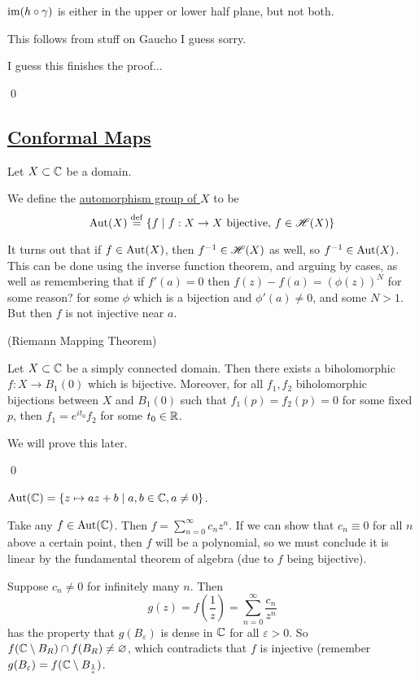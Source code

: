\documentclass[x11names,reqno,14pt]{extarticle}
\newcommand{\oo}{{\infty}}
\begin{document}
\claim

$\operatorname{\mathrm{im}}(h\circ\gamma)$ is either in the upper or lower half plane, but not both. 

\proof

This follows from stuff on Gaucho I guess sorry.

I guess this finishes the proof...

\qed

\subsection*{\underline{Conformal Maps}}

Let $X\subset\mathbb{C}$ be a domain. 


We define the \underline{automorphism group of $X$} to be
\[
{\mathrm{Aut}}(X) \overset{\mathrm{def}}{=} \{f \mid f:X\to X\text{ bijective, }f \in \mathscr{H}(X)\}
\]

It turns out that if $f \in {\mathrm{Aut}}(X)$, then $f^{-1}\in\mathscr{H}(X)$ as well, so $f^{-1}\in {\mathrm{Aut}}(X)$. This can be done using the inverse function theorem, and arguing by cases, as well as remembering that if $f'(a) = 0$ then $f(z) - f(a) = (\phi(z))^N$ for some reason? for some $\phi$ which is a bijection and $\phi'(a)\neq0$, and some $N > 1$. But then $f$ is not injective near $a$. 

\thm (Riemann Mapping Theorem)

Let $X \subset \mathbb{C}$ be a simply connected domain. Then there exists a biholomorphic $f:X\to B_1(0)$ which is bijective. Moreover, for all $f_1, f_2$ biholomorphic bijections between $X$ and $B_1(0)$ such that $f_1(p) = f_2(p) = 0$ for some fixed $p$, then $f_1 = e^{it_0}f_2$ for some $t_0 \in \mathbb{R}$. 

\proof

We will prove this later.

\qed

\thm 

${\mathrm{Aut}}(\mathbb{C}) = \{z \mapsto az + b\mid a, b \in \mathbb{C}, a \neq0\}$.

\proof

Take any $f \in {\mathrm{Aut}}(\mathbb{C})$. Then $f = \sum_{n=0}^\oo c_nz^n$. If we can show that $c_n \equiv 0$ for all $n$ above a certain point, then $f$ will be a polynomial, so we must conclude it is linear by the fundamental theorem of algebra (due to $f$ being bijective). 

Suppose $c_n \neq0$ for infinitely many $n$. Then 
\[
g(z) =f(\frac{1}{z}) = \sum_{n=0}^\oo\frac{c_n}{z^n}
\]
has the property that $g(B_\varepsilon)$ is dense in $\mathbb{C}$ for all $\varepsilon>0$. So $f(\mathbb{C}\setminus B_R)\cap f(B_R)\neq\varnothing$, which contradicts that $f$ is injective (remember $g(B_\varepsilon) = f(\mathbb{C}\setminus B_{\frac{1}{\varepsilon}})$.
\end{document}
